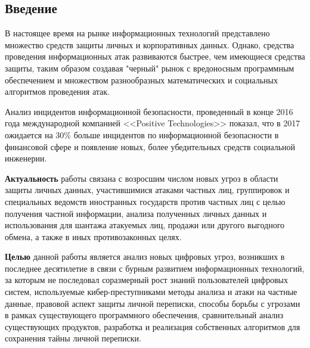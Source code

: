 \newpage
\parindent=1cm %
\begin{center}
	\section*{Введение} %
	\pagestyle{plain} %
	\setcounter{page}{3} %
\end{center}

В настоящее время на рынке информационных технологий представлено множество средств защиты личных и корпоративных данных. Однако, средства проведения информационных атак  развиваются  быстрее, чем имеющиеся средства защиты, таким образом создавая "черный"  рынок с вредоносным программным обеспечением  и множеством разнообразных математических и социальных  алгоритмов проведения атак. 

Анализ инцидентов информационной безопасности, проведенный в конце 2016 года международной компанией <<Positive Technologies>> показал, что в 2017 ожидается на 30\% больше инцидентов по информационной безопасности в финансовой сфере и появление новых, более убедительных средств социальной инженерии.  

\textbf{Актуальность} работы  связана с возросшим числом новых угроз в области защиты личных данных, участившимися атаками частных лиц, группировок и специальных ведомств иностранных государств против частных лиц с целью получения частной информации, анализа полученных личных данных   и использования для шантажа атакуемых лиц, продажи или другого выгодного обмена, а также  в иных противозаконных целях. 

\textbf{Целью} данной работы является %
 анализ новых цифровых угроз, возникших в последнее десятилетие в связи с бурным развитием информационных технологий, за которым не последовал соразмерный рост знаний пользователей цифровых систем, используемые кибер-преступниками методы анализа и атаки на частные данные, правовой аспект защиты личной переписки, способы борьбы с угрозами  в рамках существующего программного обеспечения, %
 сравнительный анализ существующих продуктов, разработка и реализация собственных алгоритмов для сохранения тайны личной переписки. 	